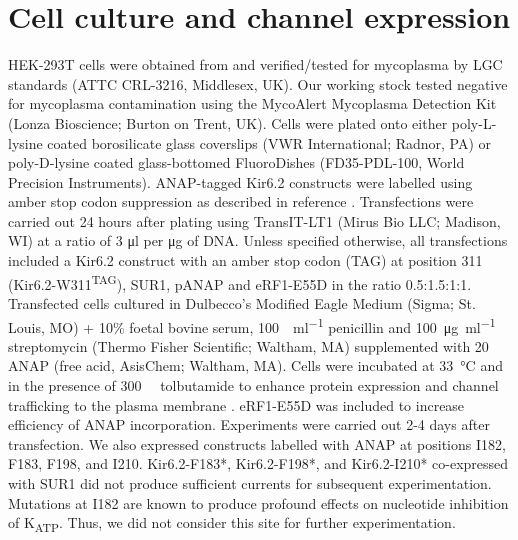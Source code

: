 \section{Cell culture and channel expression}
HEK-293T cells were obtained from and verified/tested for mycoplasma by LGC standards (ATTC CRL-3216, Middlesex, UK).
Our working stock tested negative for mycoplasma contamination using the MycoAlert Mycoplasma Detection Kit (Lonza Bioscience; Burton on Trent, UK).
Cells were plated onto either poly-L-lysine coated borosilicate glass coverslips (VWR International; Radnor, PA) or poly-D-lysine coated glass-bottomed FluoroDishes (FD35-PDL-100, World Precision Instruments).
ANAP-tagged Kir6.2 constructs were labelled using amber stop codon suppression as described in reference \cite{chatterjee_genetically_2013}.
Transfections were carried out 24 hours after plating using TransIT-LT1 (Mirus Bio LLC; Madison, WI) at a ratio of 3 \si{\micro\litre} per \si{\micro\gram} of DNA.
Unless specified otherwise, all transfections included a Kir6.2 construct with an amber stop codon (TAG) at position 311 (Kir6.2-W311\textsuperscript{TAG}), SUR1, pANAP and eRF1-E55D in the ratio 0.5:1.5:1:1.
Transfected cells cultured in Dulbecco’s Modified Eagle Medium (Sigma; St. Louis, MO) + 10\% foetal bovine serum, \SI{100}{\Unit\per\milli\litre} penicillin and \SI{100}{\micro\gram\per\milli\litre} streptomycin (Thermo Fisher Scientific; Waltham, MA) supplemented with \SI{20}{\milli\Molar} ANAP (free acid, AsisChem; Waltham, MA).
Cells were incubated at \SI{33}{\degreeCelsius} and in the presence of \SI{300}{\micro\Molar} tolbutamide to enhance protein expression and channel trafficking to the plasma membrane \cite{yan_sulfonylureas_2004, martin_pharmacological_2013}.
eRF1-E55D was included to increase efficiency of ANAP incorporation.
Experiments were carried out 2-4 days after transfection.
We also expressed constructs labelled with ANAP at positions I182, F183, F198, and I210.
Kir6.2-F183*, Kir6.2-F198*, and Kir6.2-I210* co-expressed with SUR1 did not produce sufficient currents for subsequent experimentation.
Mutations at I182 are known to produce profound effects on nucleotide inhibition of K\textsubscript{ATP}.
Thus, we did not consider this site for further experimentation.

